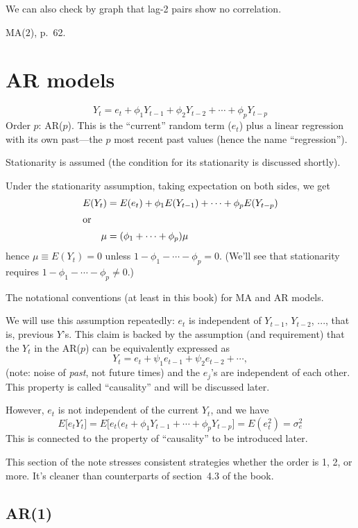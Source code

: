 \documentclass[12pt]{article}
\begin{document}
We can also check by graph that lag-2 pairs show no correlation.

\example MA($2$), p.~62.

\section{AR models}

\[
Y_t = e_t + \phi_1 Y_{t-1} + \phi_2 Y_{t-2} +\dotsb+ \phi_p Y_{t-p}
\]
Order $p$: AR($p$).
This is the ``current'' random term ($e_t$) plus a linear regression with its
own past---the $p$ most recent past values
(hence the name ``regression'').

Stationarity is assumed (the condition for its stationarity is discussed
shortly).

Under the stationarity assumption,
taking expectation on both sides, we get
\begin{align*}
E(Y_t) &= E(e_t) + \phi_1 E(Y_{t-1}) +\dotsb+ \phi_p E(Y_{t-p})\\
\intertext{or}
\mu &= (\phi_1 +\dotsb + \phi_p) \mu
\end{align*}
hence $\mu \equiv E(Y_t) = 0$ unless
$1 - \phi_1 -\dotsb - \phi_p = 0$.
(We'll see that stationarity requires
$1 - \phi_1 -\dotsb - \phi_p \ne 0$.)


\alert
The notational conventions (at least in this book) for MA and AR models.

\alert
We will use this assumption repeatedly:
$e_t$ is independent of $Y_{t-1}$, $Y_{t-2}$, ..., that is, previous
$Y$'s.
This claim is backed by the assumption (and requirement) that
the $Y_t$ in the AR($p$) can be equivalently expressed as
\[
Y_t = e_t + \psi_1 e_{t-1} + \psi_2 e_{t-2} +\dotsb
,
\]
(note: noise of \emph{past}, not future times)
and the $e_j$'s are independent of each other.
This property is called ``causality'' and will be discussed later.

\alert
However, $e_t$ is not independent of the current $Y_t$,
and we have
\[
E\bigl[e_t Y_t\bigr]
= E\bigl[e_t (e_t + \phi_1 Y_{t-1} +\dotsb+ \phi_p Y_{t-p}\bigr]
= E(e_t^2)
= \sigma_e^2
\]
This is connected to the property of ``causality'' to be introduced
later.


\alert
This section of the note stresses consistent strategies whether the
order is 1, 2, or more. It's cleaner than counterparts of
section~4.3 of the book.

\subsection{AR(1)}
\end{document}
